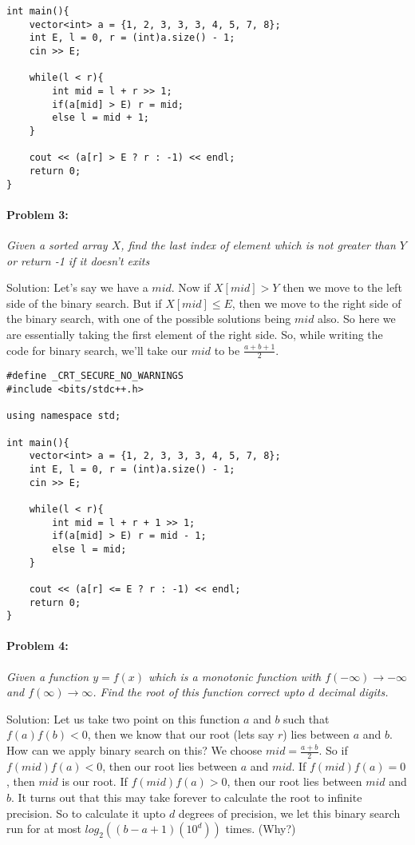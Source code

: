 \documentclass[12pt]{article}
\begin{document}
\begin{large}
\begin{verbatim}
int main(){
	vector<int> a = {1, 2, 3, 3, 3, 4, 5, 7, 8}; 
	int E, l = 0, r = (int)a.size() - 1;
	cin >> E; 

	while(l < r){
		int mid = l + r >> 1; 
		if(a[mid] > E) r = mid; 
		else l = mid + 1;
	}
	
	cout << (a[r] > E ? r : -1) << endl; 
	return 0;  
}
\end{verbatim}

\paragraph{\large Problem 3:}\textit{Given a sorted array $X$, find the last index of element which is not greater than $Y$ or return -1 if it doesn't exits}

Solution: Let's say we have a $mid$. Now if $X[mid] > Y$ then we move to the left side of the binary search. But if $X[mid]\leq E$, then we move to the right side of the binary search, with one of the possible solutions being $mid$ also. So here we are essentially taking the first element of the right side. So, while writing the code for binary search, we'll take our $mid$ to be $\frac{a+b+1}{2}$. 
\begin{verbatim}
#define _CRT_SECURE_NO_WARNINGS
#include <bits/stdc++.h>

using namespace std;

int main(){
	vector<int> a = {1, 2, 3, 3, 3, 4, 5, 7, 8}; 
	int E, l = 0, r = (int)a.size() - 1;
	cin >> E; 

	while(l < r){
		int mid = l + r + 1 >> 1; 
		if(a[mid] > E) r = mid - 1; 
		else l = mid;
	}
	
	cout << (a[r] <= E ? r : -1) << endl; 
	return 0;  
}
\end{verbatim}

\paragraph{\large Problem 4:}\textit{Given a function $y=f(x)$ which is a monotonic function with $f(-\infty) \rightarrow -\infty$ and $f(\infty) \rightarrow \infty$. Find the root of this function correct upto $d$ decimal digits.}

Solution: Let us take two point on this function $a$ and $b$ such that $f(a)f(b) < 0$, then we know that our root (lets say $r$) lies between $a$ and $b$. How can we apply binary search on this? We choose $mid = \frac{a+b}{2}$. So if $f(mid)f(a) < 0$, then our root lies between $a$ and $mid$. If $f(mid)f(a) = 0$, then $mid$ is our root. If $f(mid)f(a) > 0$, then our root lies between $mid$ and $b$. It turns out that this may take forever to calculate the root to infinite precision. So to calculate it upto $d$ degrees of precision, we let this binary search run for at most $log_2((b - a + 1)(10^{d}))$ times. (Why?)


\end{large}
\end{document}
